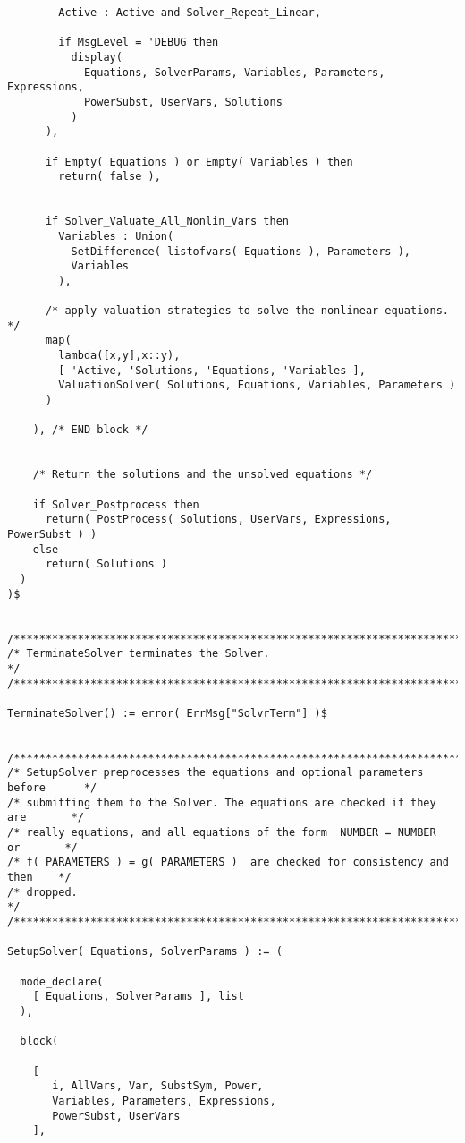 \begin{verbatim}
        Active : Active and Solver_Repeat_Linear,

        if MsgLevel = 'DEBUG then
          display(
            Equations, SolverParams, Variables, Parameters, Expressions,
            PowerSubst, UserVars, Solutions
          )
      ),

      if Empty( Equations ) or Empty( Variables ) then
        return( false ),


      if Solver_Valuate_All_Nonlin_Vars then
        Variables : Union(
          SetDifference( listofvars( Equations ), Parameters ),
          Variables
        ),

      /* apply valuation strategies to solve the nonlinear equations. */
      map(
        lambda([x,y],x::y),
        [ 'Active, 'Solutions, 'Equations, 'Variables ],
        ValuationSolver( Solutions, Equations, Variables, Parameters )
      )

    ), /* END block */


    /* Return the solutions and the unsolved equations */

    if Solver_Postprocess then
      return( PostProcess( Solutions, UserVars, Expressions, PowerSubst ) )
    else
      return( Solutions )
  )
)$


/******************************************************************************/
/* TerminateSolver terminates the Solver.                                     */
/******************************************************************************/

TerminateSolver() := error( ErrMsg["SolvrTerm"] )$


/******************************************************************************/
/* SetupSolver preprocesses the equations and optional parameters before      */
/* submitting them to the Solver. The equations are checked if they are       */
/* really equations, and all equations of the form  NUMBER = NUMBER  or       */
/* f( PARAMETERS ) = g( PARAMETERS )  are checked for consistency and then    */
/* dropped.                                                                   */
/******************************************************************************/

SetupSolver( Equations, SolverParams ) := (

  mode_declare(
    [ Equations, SolverParams ], list
  ),

  block(

    [
       i, AllVars, Var, SubstSym, Power,
       Variables, Parameters, Expressions,
       PowerSubst, UserVars
    ],


\end{verbatim}
